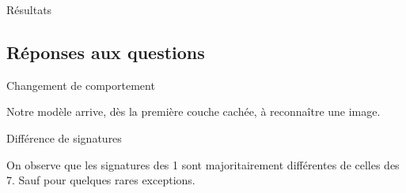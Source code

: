 \documentclass[10pt,handout]{beamer}
\newif\ifplacelogo %
\begin{document}
\placelogofalse
\begin{frame}{Résultats}
\end{frame}
\placelogotrue

\subsection{Réponses aux questions}
\begin{frame}{Changement de comportement}
    \begin{block}{}
        Notre modèle arrive, dès la première couche cachée, à reconnaître une image.
    \end{block}
    
\end{frame}

\begin{frame}{Différence de signatures}
    \begin{block}{}
        On observe que les signatures des 1 sont majoritairement différentes de celles des 7. Sauf pour quelques rares exceptions.
    \end{block}


\end{frame}
\end{document}
